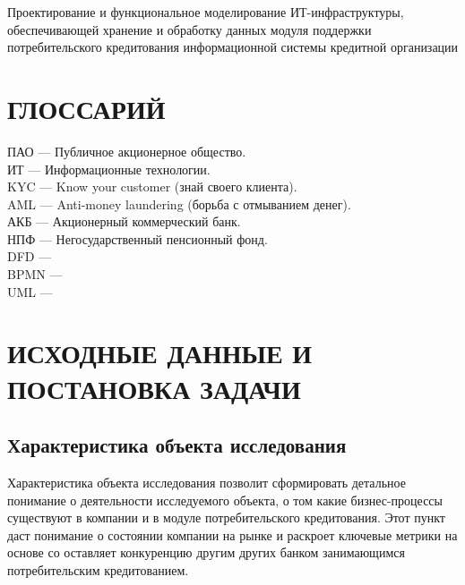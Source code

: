 \documentclass[14pt, a4paper]{extarticle}
\begin{document}
Проектирование и функциональное моделирование ИТ-инфраструктуры, обеспечивающей
хранение и обработку данных модуля поддержки потребительского кредитования
информационной системы кредитной организации

\section*{ГЛОССАРИЙ}
{}
\begin{raggedright}
	ПАО --- Публичное акционерное общество. \\
	ИТ --- Информационные технологии. \\
	KYC --- Know your customer (знай своего клиента). \\
	AML --- Anti-money laundering (борьба с отмыванием денег). \\
	АКБ --- Акционерный коммерческий банк. \\
	НПФ --- Негосударственный пенсионный фонд. \\
	DFD --- \\
	BPMN --- \\
	UML --- \\
\end{raggedright}

\section{ИСХОДНЫЕ ДАННЫЕ И ПОСТАНОВКА ЗАДАЧИ}

\subsection{Характеристика объекта исследования}

Характеристика объекта исследования позволит сформировать детальное понимание о
деятельности исследуемого объекта, о том какие бизнес-процессы существуют в
компании и в модуле потребительского кредитования. Этот пункт даст понимание о
состоянии компании на рынке и раскроет ключевые метрики на основе со
оставляет конкуренцию другим других банком занимающимся потребительским
кредитованием.
\end{document}
